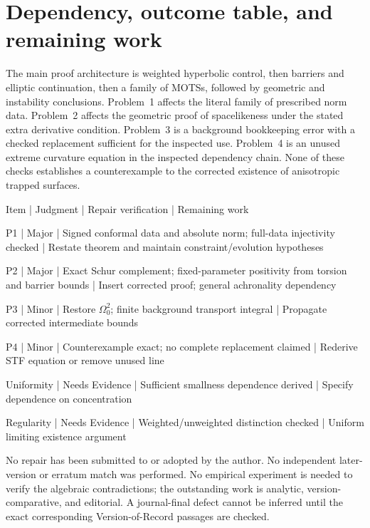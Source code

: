 \documentclass[10pt]{article}
\begin{document}
\section*{Dependency, outcome table, and remaining work}
The main proof architecture is weighted hyperbolic control, then barriers and elliptic continuation, then a family of MOTSs, followed by geometric and instability conclusions. Problem 1 affects the literal family of prescribed norm data. Problem 2 affects the geometric proof of spacelikeness under the stated extra derivative condition. Problem 3 is a background bookkeeping error with a checked replacement sufficient for the inspected use. Problem 4 is an unused extreme curvature equation in the inspected dependency chain. None of these checks establishes a counterexample to the corrected existence of anisotropic trapped surfaces.\par
Item | Judgment | Repair verification | Remaining work\par
P1 | Major | Signed conformal data and absolute norm; full-data injectivity checked | Restate theorem and maintain constraint/evolution hypotheses\par
P2 | Major | Exact Schur complement; fixed-parameter positivity from torsion and barrier bounds | Insert corrected proof; general achronality dependency\par
P3 | Minor | Restore \(\Omega_0^2\); finite background transport integral | Propagate corrected intermediate bounds\par
P4 | Minor | Counterexample exact; no complete replacement claimed | Rederive STF equation or remove unused line\par
Uniformity | Needs Evidence | Sufficient smallness dependence derived | Specify dependence on concentration\par
Regularity | Needs Evidence | Weighted/unweighted distinction checked | Uniform limiting existence argument\par
No repair has been submitted to or adopted by the author. No independent later-version or erratum match was performed. No empirical experiment is needed to verify the algebraic contradictions; the outstanding work is analytic, version-comparative, and editorial. A journal-final defect cannot be inferred until the exact corresponding Version-of-Record passages are checked.\par
\end{document}
